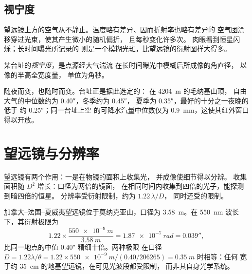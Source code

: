 \subsection*{视宁度}

望远镜上方的空气从不静止。温度略有差异、因而折射率也略有差异的
空气团漂移穿过光束，使其产生微小的随机偏折，
且每秒变化许多次。
肉眼看到恒星闪烁；长时间曝光所记录的
则是一个模糊光斑，比望远镜的衍射图样大得多。

\begin{definition}[视宁度]\label{def:b1:observing-the-sky:seeing}
某台址的\emph{视宁度}，是点源经大气湍流
在长时间曝光中模糊后所成像的角直径，
以像的半高全宽度量，
单位为角秒。
\end{definition}

随夜而变，也随时而变。台址正是据此选定的：
在 \qty{4204}{m} 的毛纳基山顶，
自由大气的中位数约为 \ang{;;0.40}，冬季约为 \ang{;;0.45}，
夏季为 \ang{;;0.35}，最好的十分之一夜晚的低于
约 \ang{;;0.25}；同一台址上空
的可降水汽量中位数仅为 \qty{0.9}{mm}，这使其红外窗口得以开放。

\section{望远镜与分辨率}

望远镜有两个作用：一是在物镜的面积上收集光，
并成像使细节得以分辨。
收集面积随 $D^2$ 增长：口径为两倍的镜面，
在相同时间内收集到四倍的光子，能探测到暗四倍的恒星。
分辨率受衍射限制，约为 $1.22\,\lambda/D$，
同时还受的限制。

\begin{example}
加拿大–法国–夏威夷望远镜位于莫纳克亚山，口径为
\qty{3.58}{m}。在 \qty{550}{nm} 波长下，其衍射极限为
\[
  1.22\times\frac{\qty{550e-9}{m}}{\qty{3.58}{m}} = \qty{1.87e-7}{rad}
  = \ang{;;0.039},
\]
比同一地点的中值 \ang{;;0.40} 精细十倍。两种极限
在口径 $D = 1.22\lambda/\theta =
1.22\times\qty{550e-9}{m}/(\num{0.40}/\num{206265}) = \qty{0.35}{m}$ 时相等：任何
宽于约 \qty{35}{cm} 的地基望远镜，在可见光波段都受限制，
而非其自身光学系统。
\end{example}

